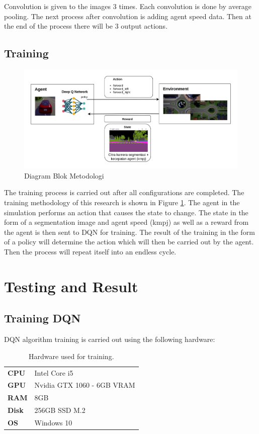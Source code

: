 \documentclass[conference]{IEEEtran}
\begin{document}
Convolution is given to the images 3 times. Each convolution is done by average pooling. The next process after convolution is adding agent speed data. Then at the end of the process there will be 3 output actions.

\subsection{Training}
\label{sec:training}

\begin{figure}[H] 
	\centering
	\includegraphics[width=1\linewidth]{images/metodologi}
	\caption{Diagram Blok Metodologi}
	\label{fig:blockdiagram}
\end{figure}

The training process is carried out after all configurations are completed. The training methodology of this research is shown in Figure \ref{fig:blockdiagram}. The agent in the simulation performs an action that causes the state to change. The state in the form of a segmentation image and agent speed (kmpj) as well as a reward from the agent is then sent to DQN for training. The result of the training in the form of a policy will determine the action which will then be carried out by the agent. Then the process will repeat itself into an endless cycle.

	
	
	
	\section{Testing and Result}
	\subsection{Training DQN}
	\label{sec:training_dqn}
	DQN algorithm training is carried out using the following hardware:
	\begin{table}[H]
		\begin{tabular}{ll}
			\textbf{CPU}  & Intel Core i5              \\
			\textbf{GPU}  & Nvidia GTX 1060 - 6GB VRAM \\
			\textbf{RAM}  & 8GB                        \\
			\textbf{Disk} & 256GB SSD M.2              \\
			\textbf{OS}   & Windows 10                
		\end{tabular}
		\caption{Hardware used for training.}
		\label{tb:hardwaresetup}
	\end{table}
	
\end{document}
